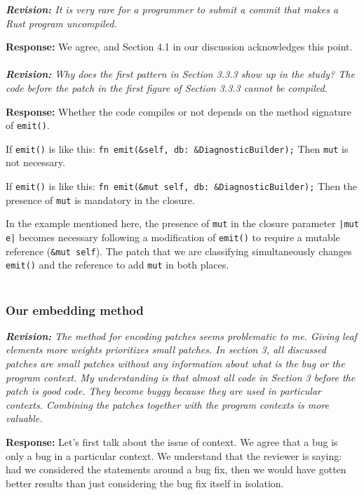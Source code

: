 \documentclass{article}
\begin{document}
\textit{\textbf{Revision:} It is very rare for a programmer to submit a commit that makes a Rust program uncompiled.}

\textbf{Response:} We agree, and Section 4.1 in our discussion acknowledges this point. \\ \\

\textit{\textbf{Revision:} Why does the first pattern in Section 3.3.3 show up in the study? The code before the patch in the first figure of Section 3.3.3 cannot be compiled.}

\textbf{Response:} Whether the code compiles or not depends on the method signature of \verb+emit()+.

If \verb+emit()+ is like this:
    \verb+fn emit(&self, db: &DiagnosticBuilder);+
Then \verb+mut+  is not necessary.

If \verb+emit()+ is like this:
    \verb+fn emit(&mut self, db: &DiagnosticBuilder);+
Then the presence of \verb+mut+ is mandatory in the closure. 

In the example mentioned here, the presence of \verb+mut+ in the closure parameter \verb+|mut e|+ becomes necessary following a modification of \verb+emit()+ to require a mutable reference (\verb+&mut self+). The patch that we are classifying simultaneously changes \verb+emit()+ and the reference to add \verb+mut+ in both places. \\ \\

\subsubsection{\label{rev:2:embedding}Our embedding method}

\textit{\textbf{Revision:} The method for encoding patches seems problematic to me. Giving leaf elements more weights prioritizes small patches. In section 3, all discussed patches are small patches without any information about what is the bug or the program context. My understanding is that almost all code in Section 3 before the patch is good code. They become buggy because they are used in particular contexts. Combining the patches together with the program contexts is more valuable.}

\textbf{Response:} Let's first talk about the issue of context. We agree that a bug is only a bug in a particular context. We understand that the reviewer is saying: had we considered the statements around a bug fix, then we would have gotten better results than just considering the bug fix itself in isolation. 
\end{document}
